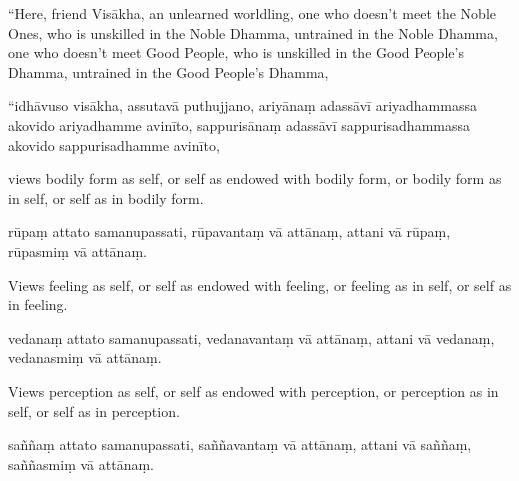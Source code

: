 \begin{samepage}
\begin{leftcolumn*}
“Here, friend Visākha, an unlearned worldling, one who doesn’t meet the Noble Ones, who is unskilled in the Noble Dhamma, untrained in the Noble Dhamma, one who doesn’t meet Good People, who is unskilled in the Good People’s Dhamma, untrained in the Good People’s Dhamma,
\end{leftcolumn*}

\begin{rightcolumn}
“idhāvuso visākha, assutavā puthujjano, ariyānaṃ adassāvī ariyadhammassa akovido ariyadhamme avinīto, sappurisānaṃ adassāvī sappurisadhammassa akovido sappurisadhamme avinīto,
\end{rightcolumn}
\end{samepage}

\begin{samepage}
\begin{leftcolumn*}
views bodily form as self, or self as endowed with bodily form, or bodily form as in self, or self as in bodily form.
\end{leftcolumn*}

\begin{rightcolumn}
rūpaṃ attato samanupassati, rūpavantaṃ vā attānaṃ, attani vā rūpaṃ, rūpasmiṃ vā attānaṃ.
\end{rightcolumn}
\end{samepage}

\begin{samepage}
\begin{leftcolumn*}
Views feeling as self, or self as endowed with feeling, or feeling as in self, or self as in feeling.
\end{leftcolumn*}

\begin{rightcolumn}
vedanaṃ attato samanupassati, vedanavantaṃ vā attānaṃ, attani vā vedanaṃ, vedanasmiṃ vā attānaṃ.
\end{rightcolumn}
\end{samepage}

\begin{samepage}
\begin{leftcolumn*}
Views perception as self, or self as endowed with perception, or perception as in self, or self as in perception.
\end{leftcolumn*}

\begin{rightcolumn}
saññaṃ attato samanupassati, saññavantaṃ vā attānaṃ, attani vā saññaṃ, saññasmiṃ vā attānaṃ.
\end{rightcolumn}
\end{samepage}

